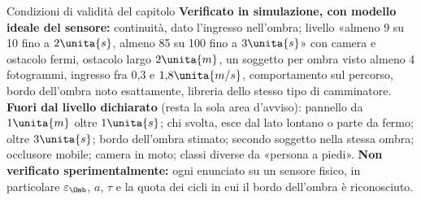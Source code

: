 \begin{riquadro}{Condizioni di validità del capitolo}
\textbf{Verificato in simulazione, con modello ideale del sensore:} continuità, dato l'ingresso nell'ombra; livello «almeno 9 su 10 fino a $2\unita{s}$, almeno 85 su 100 fino a $3\unita{s}$» con camera e ostacolo fermi, ostacolo largo $2\unita{m}$, un soggetto per ombra visto almeno 4 fotogrammi, ingresso fra 0,3 e $1{,}8\unita{m/s}$, comportamento sul percorso, bordo dell'ombra noto esattamente, libreria dello stesso tipo di camminatore.
\textbf{Fuori dal livello dichiarato} (resta la sola area d'avviso): pannello da $1\unita{m}$ oltre $1\unita{s}$; chi svolta, esce dal lato lontano o parte da fermo; oltre $3\unita{s}$; bordo dell'ombra stimato; secondo soggetto nella stessa ombra; occlusore mobile; camera in moto; classi diverse da «persona a piedi».
\textbf{Non verificato sperimentalmente:} ogni enunciato su un sensore fisico, in particolare $\varepsilon_\Omb$, $a$, $\tau$ e la quota dei cicli in cui il bordo dell'ombra è riconosciuto.
\end{riquadro}
